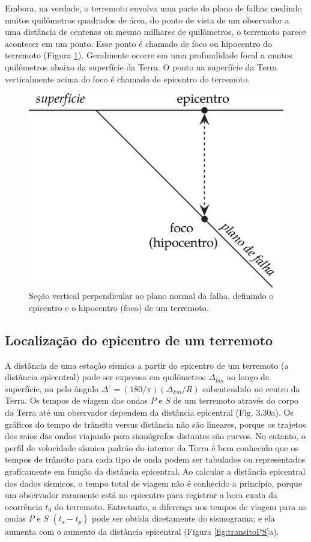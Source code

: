 \documentclass[]{book}
\theoremstyle{definition}
\theoremstyle{definition}
\theoremstyle{definition}
\theoremstyle{remark}
\begin{document}
Embora, na verdade, o terremoto envolva uma parte do plano de falhas medindo muitos quilômetros quadrados de área, do ponto de vista de um observador a uma distância de centenas ou mesmo milhares de quilômetros, o terremoto parece acontecer em um ponto. Esse ponto é chamado de foco ou hipocentro do terremoto (Figura \ref{fig:epicentro}). Geralmente ocorre em uma profundidade focal a muitos quilômetros abaixo da superfície da Terra. O ponto na superfície da Terra verticalmente acima do foco é chamado de epicentro do terremoto.

\begin{figure}

{\centering \includegraphics[width=0.4\linewidth]{fig/Fig_03.16} 

}

\caption{Seção vertical perpendicular ao plano normal da falha, definindo o epicentro e o hipocentro (foco) de um terremoto.}\label{fig:epicentro}
\end{figure}

\hypertarget{localizacao-do-epicentro-de-um-terremoto}{%
\subsection{Localização do epicentro de um terremoto}\label{localizacao-do-epicentro-de-um-terremoto}}

A distância de uma estação sísmica a partir do epicentro de um terremoto (a distância epicentral) pode ser expressa em quilômetros \(\Delta_{km}\) ao longo da superfície, ou pelo ângulo \(\Delta^\circ=(180/\pi)(\Delta_{km}/R)\) subentendido no centro da Terra. Os tempos de viagem das ondas \(P\) e \(S\) de um terremoto através do corpo da Terra até um observador dependem da distância epicentral (Fig. 3.30a). Os gráficos do tempo de trânsito versus distância não são lineares, porque os trajetos dos raios das ondas viajando para sismógrafos distantes são curvos. No entanto, o perfil de velocidade sísmica padrão do interior da Terra é bem conhecido que os tempos de trânsito para cada tipo de onda podem ser tabulados ou representados graficamente em função da distância epicentral. Ao calcular a distância epicentral dos dados sísmicos, o tempo total de viagem não é conhecido a princípio, porque um observador raramente está no epicentro para registrar a hora exata da ocorrência \(t_0\) do terremoto. Entretanto, a diferença nos tempos de viagem para as ondas \(P\) e \(S\) \((t_s - t_p)\) pode ser obtida diretamente do sismograma; e ela aumenta com o aumento da distância epicentral (Figura \ref{fig:transitoPS}a).
\end{document}
